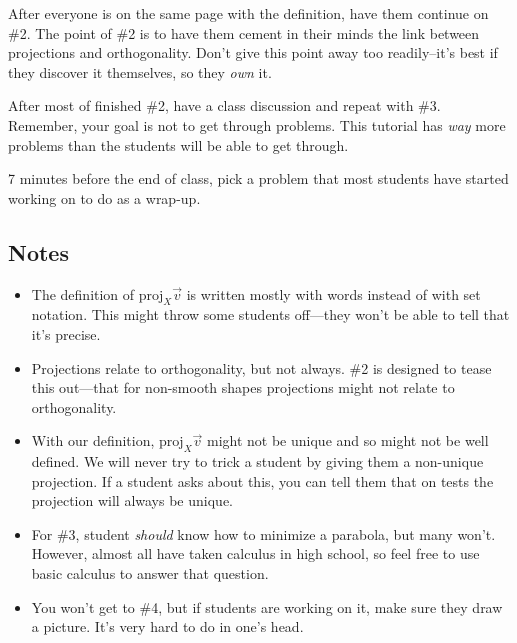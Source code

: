 \documentclass[red]{tutorial}
\newcommand{\Proj}{\mathrm{proj}}
\theoremstyle{definition}
\theoremstyle{theorem}
\begin{document}
\begin{instructions}
		After everyone is on the same page with the definition, have them continue on \#2.
		The point of \#2 is to have them cement in their minds the link between projections
		and orthogonality. Don't give this point away too readily--it's best if they discover it themselves, so
		they \emph{own} it.

		After most of finished \#2, have a class discussion and repeat with \#3. Remember, your goal
		is not to get through problems. This tutorial has \emph{way} more problems than the students
		will be able to get through.

		7 minutes before the end of class, pick a problem that most students have started working on
		to do as a wrap-up.

\subsection*{Notes}
	\begin{itemize}
		\item The definition of $\Proj_X\vec v$ is written mostly with words instead of with
			set notation. This might throw some students off---they won't be able to tell that it's precise.
		\item Projections relate to orthogonality, but not always. \#2 is designed to tease this out---that
			for non-smooth shapes projections might not relate to orthogonality.
		\item With our definition, $\Proj_X\vec v$ might not be unique and so might not be well defined. We will
			never try to trick a student by giving them a non-unique projection. If a student asks about
			this, you can tell them that on tests the projection will always be unique.
		\item For \#3, student \emph{should} know how to minimize a parabola, but many won't. However, almost all
			have taken calculus in high school, so feel free to use basic calculus to answer that question.
		\item You won't get to \#4, but if students are working on it, make sure they draw a picture. It's very
			hard to do in one's head.
	\end{itemize}

	\end{instructions}
\end{document}
